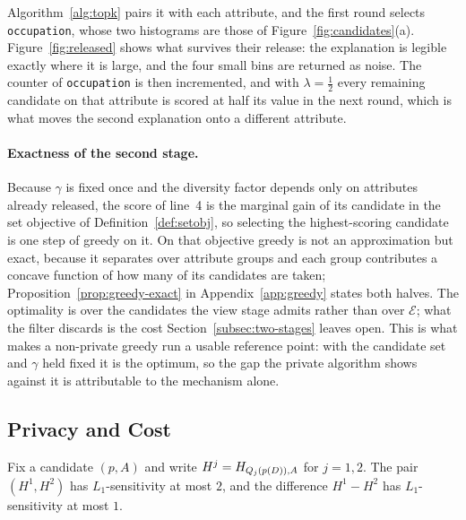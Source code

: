 Algorithm~\ref{alg:topk} pairs it with each attribute, and the first round selects \texttt{occupation}, whose two histograms are those of Figure~\ref{fig:candidates}(a).
Figure~\ref{fig:released} shows what survives their release: the explanation is legible exactly where it is large, and the four small bins are returned as noise.
The counter of \texttt{occupation} is then incremented, and with $\lambda=\tfrac12$ every remaining candidate on that attribute is scored at half its value in the next round, which is what moves the second explanation onto a different attribute.

\paragraph{Exactness of the second stage.}
Because $\gamma$ is fixed once and the diversity factor depends only on attributes already released, the score of line~4 is the marginal gain of its candidate in the set objective of Definition~\ref{def:setobj}, so selecting the highest-scoring candidate is one step of greedy on it.
On that objective greedy is not an approximation but exact, because it separates over attribute groups and each group contributes a concave function of how many of its candidates are taken; Proposition~\ref{prop:greedy-exact} in Appendix~\ref{app:greedy} states both halves.
The optimality is over the candidates the view stage admits rather than over $\mathcal{E}$; what the filter discards is the cost Section~\ref{subsec:two-stages} leaves open.
This is what makes a non-private greedy run a usable reference point: with the candidate set and $\gamma$ held fixed it is the optimum, so the gap the private algorithm shows against it is attributable to the mechanism alone.

\subsection{Privacy and Cost}
\label{subsec:dp-proof}

\begin{proposition}
\label{prop:histogram-release-sensitivity}
Fix a candidate $(p,A)$ and write $H^j=H_{Q_j(p(D)),A}$ for $j=1,2$.
The pair $(H^1,H^2)$ has $L_1$-sensitivity at most $2$, and the difference $H^1-H^2$ has $L_1$-sensitivity at most $1$.
\end{proposition}

